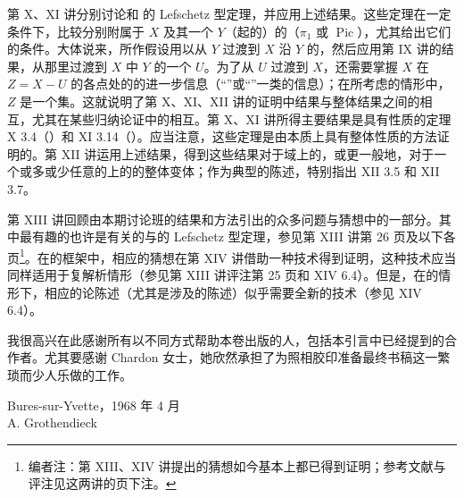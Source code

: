 第 X、XI 讲分别讨论和 的 Lefschetz 型定理，并应用上述结果。这些定理在一定条件下，比较分别附属于 $X$ 及其一个 $Y$（起的）的（$\pi_{1}$ 或 $\operatorname{Pic}$），尤其给出它们的条件。大体说来，所作假设用以从 $Y$ 过渡到 $X$ 沿 $Y$ 的，然后应用第 IX 讲的结果，从那里过渡到 $X$ 中 $Y$ 的一个 $U$。为了从 $U$ 过渡到 $X$，还需要掌握 $X$ 在 $Z=X-U$ 的各点处的的进一步信息（“”或“”一类的信息）；在所考虑的情形中，$Z$ 是一个集。这就说明了第 X、XI、XII 讲的证明中结果与整体结果之间的相互，尤其在某些归纳论证中的相互。第 X、XI 讲所得主要结果是具有性质的定理 X 3.4（）和 XI 3.14（）。应当注意，这些定理是由本质上具有整体性质的方法证明的。第 XII 讲运用上述结果，得到这些结果对于域上的，或更一般地，对于一个或多或少任意的上的的整体变体；作为典型的陈述，特别指出 XII 3.5 和 XII 3.7。

第 XIII 讲回顾由本期讨论班的结果和方法引出的众多问题与猜想中的一部分。其中最有趣的也许是有关的与的 Lefschetz 型定理，参见第 XIII 讲第 26 页及以下各页\footnote[5]{编者注：第 XIII、XIV 讲提出的猜想如今基本上都已得到证明；参考文献与评注见这两讲的页下注。}。在的框架中，相应的猜想在第 XIV 讲借助一种技术得到证明，这种技术应当同样适用于复解析情形（参见第 XIII 讲评注第 25 页和 XIV 6.4）。但是，在的情形下，相应的论陈述（尤其是涉及的陈述）似乎需要全新的技术（参见 XIV 6.4）。

我很高兴在此感谢所有以不同方式帮助本卷出版的人，包括本引言中已经提到的合作者。尤其要感谢 Chardon 女士，她欣然承担了为照相胶印准备最终书稿这一繁琐而少人乐做的工作。

\begin{flushright}
Bures-sur-Yvette，1968 年 4 月\\
A. Grothendieck
\end{flushright}
